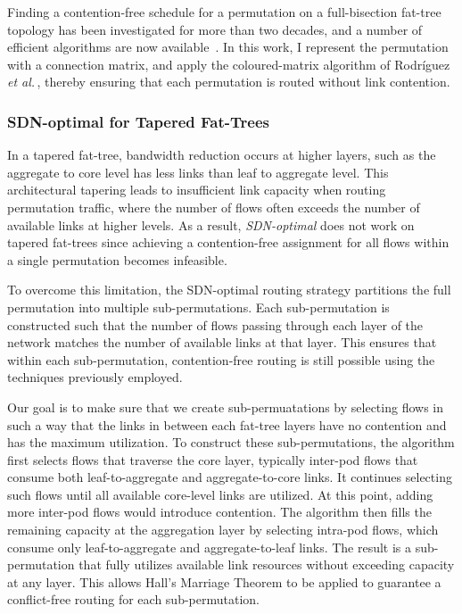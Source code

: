 Finding a contention-free schedule for a permutation on a full-bisection
fat-tree topology has been investigated for more than two decades, and a
number of efficient algorithms are now available\,%
\cite{Paull1962,Rodriguez2009,Zahavi2010,Prisacari2013}.  In this work, I
represent the permutation with a connection
matrix,\cite{Paull1962} and apply the coloured-matrix algorithm of
Rodríguez \emph{et al.}\,\cite{Rodriguez2009}, thereby ensuring that each
permutation is routed without link contention.

\subsubsection{SDN-optimal for Tapered Fat-Trees}

In a tapered fat-tree, bandwidth reduction occurs at higher layers,
such as the aggregate to core level has less links than leaf to aggregate
level. This architectural tapering leads to insufficient link capacity
when routing permutation traffic, where the number of flows often
exceeds the number of available links at higher levels.
As a result, \textit{SDN-optimal} does not work on tapered fat-trees
since achieving a contention-free assignment for all flows within a
single permutation becomes infeasible.

To overcome this limitation, the SDN-optimal routing strategy
partitions the full permutation into multiple sub-permutations.
Each sub-permutation is constructed such that the number of flows
passing through each layer of the network matches the number of
available links at that layer. This ensures that within each
sub-permutation, contention-free routing is still possible using
the techniques previously employed.

Our goal is to make sure that we create sub-permuatations by
selecting flows in such a way that the links in between each
fat-tree layers have no contention and has the maximum utilization. 
To construct these sub-permutations, the algorithm first selects
flows that traverse the core layer, typically inter-pod flows that consume both leaf-to-aggregate and aggregate-to-core links. It continues selecting such flows until all available core-level links are utilized. At this point, adding more inter-pod flows would introduce contention. The algorithm then fills the remaining capacity at the aggregation layer by selecting intra-pod flows, which consume only leaf-to-aggregate and aggregate-to-leaf links. The result is a sub-permutation that fully utilizes available link resources without exceeding capacity at any layer. This allows Hall’s Marriage Theorem \cite{cameron2025hall} \cite{hall1987representatives} to be applied to guarantee a conflict-free routing for each sub-permutation.

